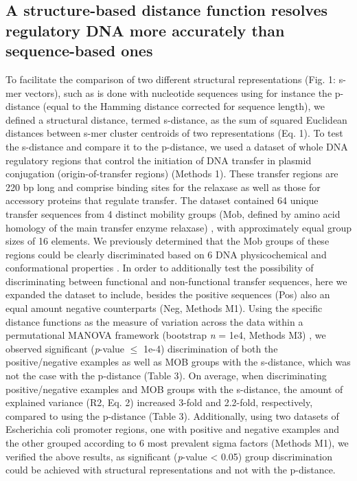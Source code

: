 \documentclass[10pt]{article}
\begin{document}
\subsection{A structure-based distance function resolves regulatory DNA more accurately than sequence-based ones}
To facilitate the comparison of two different structural representations (Fig. 1: s-mer vectors), such as is done with nucleotide sequences using for instance the p-distance (equal to the Hamming distance corrected for sequence length), we defined a structural distance, termed s-distance, as the sum of squared Euclidean distances between s-mer cluster centroids of two representations (Eq. 1). To test the s-distance and compare it to the p-distance, we used a dataset of whole DNA regulatory regions that control the initiation of DNA transfer in plasmid conjugation (origin-of-transfer regions) \cite{De_La_Cruz2010-xj} (Methods 1). These transfer regions are 220 bp long and comprise binding sites for the relaxase as well as those for accessory proteins that regulate transfer. The dataset contained 64 unique transfer sequences \cite{Zrimec2018-lx} from 4 distinct mobility groups (Mob, defined by amino acid homology of the main transfer enzyme relaxase) \cite{Garcillan-Barcia2009-yk}, with approximately equal group sizes of 16 elements. We previously determined that the Mob groups of these regions could be clearly discriminated based on 6 DNA physicochemical and conformational properties \cite{Zrimec2018-lx}. In order to additionally test the possibility of discriminating between functional and non-functional transfer sequences, here we expanded the dataset to include, besides the positive sequences (Pos) also an equal amount negative counterparts (Neg, Methods M1). Using the specific distance functions as the measure of variation across the data within a permutational MANOVA framework (bootstrap \textit{n} = 1e4, Methods M3) \cite{Anderson2005-pu}, we observed significant (\textit{p}-value \(\leq\) 1e-4) discrimination of both the positive/negative examples as well as MOB groups with the s-distance, which was not the case with the p-distance (Table 3). On average, when discriminating positive/negative examples and MOB groups with the s-distance, the amount of explained variance (R2, Eq. 2) increased 3-fold and 2.2-fold, respectively, compared to using the p-distance (Table 3). Additionally, using two datasets of Escherichia coli promoter regions, one with positive and negative examples \cite{Gusmao2014-hp} and the other grouped according to 6 most prevalent sigma factors \cite{Gama-Castro2016-so} (Methods M1), we verified the above results, as significant (\textit{p}-value \textless{} 0.05) group discrimination could be achieved with structural representations and not with the p-distance.
\end{document}
